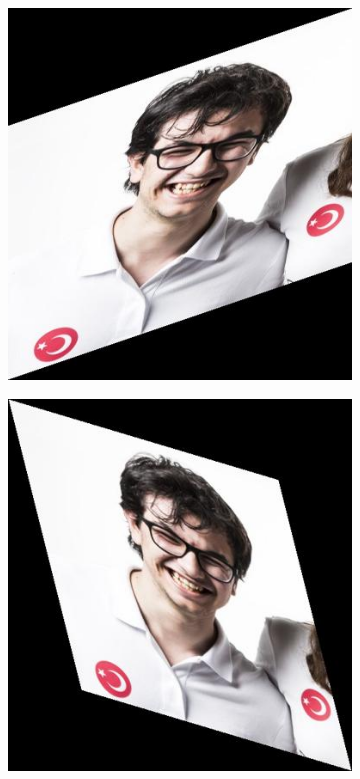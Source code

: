 \documentclass{article}
\begin{document}
\begin{figure}[!htb]
\begin{subfigure}{.25\textwidth}
\end{subfigure}
\begin{subfigure}{.25\textwidth}
  \centering
  \includegraphics[width=.99\textwidth]{ahmet6.jpg}
\end{subfigure}%
\begin{subfigure}{.25\textwidth}
  \centering
  \includegraphics[width=.99\textwidth]{ahmet7.jpg}

\end{subfigure}
\end{figure}
\end{document}
